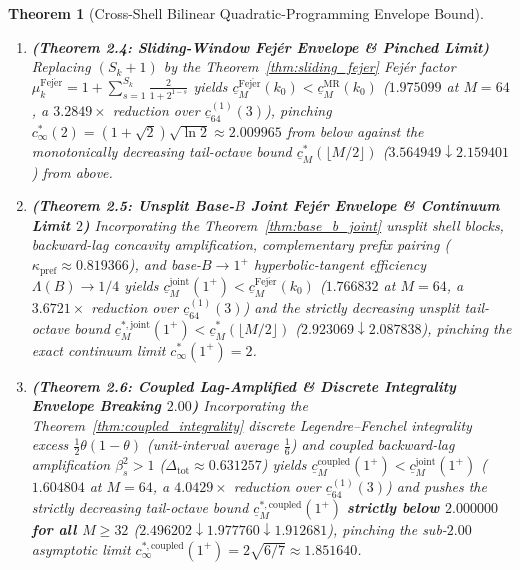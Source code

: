\documentclass[11pt,reqno]{amsart}
\newtheorem{theorem}{Theorem}[section]
\theoremstyle{definition}
\theoremstyle{remark}
\begin{document}
\begin{theorem}[Cross-Shell Bilinear Quadratic-Programming Envelope Bound]
\begin{enumerate}
  achieving a $2.7896\times$ reduction over $\underline{c}_{64}^{(1)}(3)$ at $M = 64$ ($\underline{c}_{64}^{\mathrm{MR}}(3) = 2.325791$).
  \item[\textup{(iv)}] \textbf{(Theorem 2.4: Sliding-Window Fej\'er Envelope \& Pinched Limit)} Replacing $(S_k + 1)$ by the Theorem~\ref{thm:sliding_fejer} Fej\'er factor $\mu_k^{\mathrm{Fej\acute{e}r}} = 1 + \sum_{s=1}^{S_k} \frac{2}{1 + 2^{1-s}}$ yields $\underline{c}_M^{\mathrm{Fej\acute{e}r}}(k_0) < \underline{c}_M^{\mathrm{MR}}(k_0)$ ($1.975099$ at $M = 64$, a $3.2849\times$ reduction over $\underline{c}_{64}^{(1)}(3)$), pinching $c_\infty^*(2) = (1 + \sqrt{2})\sqrt{\ln 2} \approx 2.009965$ from below against the monotonically decreasing tail-octave bound $\underline{c}_M^*(\lfloor M/2\rfloor)$ ($3.564949 \downarrow 2.159401$) from above.
  \item[\textup{(v)}] \textbf{(Theorem 2.5: Unsplit Base-$B$ Joint Fej\'er Envelope \& Continuum Limit $2$)} Incorporating the Theorem~\ref{thm:base_b_joint} unsplit shell blocks, backward-lag concavity amplification, complementary prefix pairing ($\kappa_{\mathrm{pref}} \approx 0.819366$), and base-$B \to 1^+$ hyperbolic-tangent efficiency $\Lambda(B) \to 1/4$ yields $\underline{c}_M^{\mathrm{joint}}(1^+) < \underline{c}_M^{\mathrm{Fej\acute{e}r}}(k_0)$ ($1.766832$ at $M = 64$, a $3.6721\times$ reduction over $\underline{c}_{64}^{(1)}(3)$) and the strictly decreasing unsplit tail-octave bound $\underline{c}_M^{*,\mathrm{joint}}(1^+) < \underline{c}_M^*(\lfloor M/2\rfloor)$ ($2.923069 \downarrow 2.087838$), pinching the exact continuum limit $c_\infty^*(1^+) = 2$.
  \item[\textup{(vi)}] \textbf{(Theorem 2.6: Coupled Lag-Amplified \& Discrete Integrality Envelope Breaking $2.00$)} Incorporating the Theorem~\ref{thm:coupled_integrality} discrete Legendre--Fenchel integrality excess $\frac{1}{2}\theta(1-\theta)$ (unit-interval average $\frac{1}{6}$) and coupled backward-lag amplification $\beta_s^2 > 1$ ($\Delta_{\mathrm{tot}} \approx 0.631257$) yields $\underline{c}_M^{\mathrm{coupled}}(1^+) < \underline{c}_M^{\mathrm{joint}}(1^+)$ ($1.604804$ at $M = 64$, a $4.0429\times$ reduction over $\underline{c}_{64}^{(1)}(3)$) and pushes the strictly decreasing tail-octave bound $\underline{c}_M^{*,\mathrm{coupled}}(1^+)$ \textbf{strictly below $2.000000$ for all $M \ge 32$} ($2.496202 \downarrow 1.977760 \downarrow 1.912681$), pinching the sub-$2.00$ asymptotic limit $c_\infty^{*,\mathrm{coupled}}(1^+) = 2\sqrt{6/7} \approx 1.851640$.

\end{enumerate}
\end{theorem}
\end{document}
